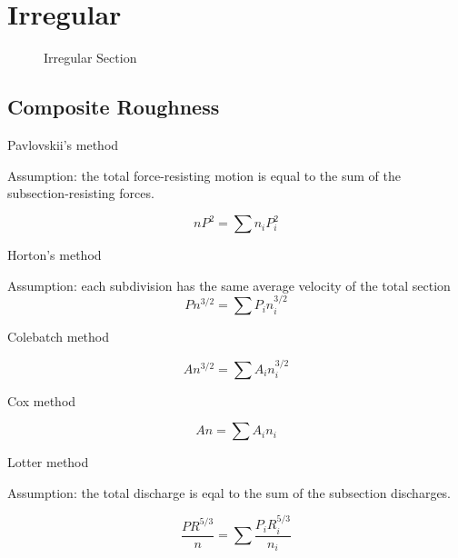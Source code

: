 
\section{Irregular}
\begin{figure}[h]
\centering
{}
\caption{Irregular Section}
\end{figure}

\subsection{Composite Roughness}

\noindent Pavlovskii's method

\noindent Assumption: the total force-resisting motion is equal to the sum of the subsection-resisting forces.

\begin{equation}
nP^2 = \sum n_iP_i^2
\end{equation}

\noindent Horton's method

\noindent Assumption: each subdivision has the same average velocity of the total section
\begin{equation}
Pn^{3/2} = \sum P_i  n_i^{3/2}
\end{equation}

\noindent Colebatch method

\begin{equation}
An^{3/2} = \sum A_i  n_i^{3/2}
\end{equation}

\noindent Cox method

\begin{equation}
An = \sum A_i  n_i
\end{equation}

\noindent Lotter method

\noindent Assumption: the total discharge is eqal to the sum of the subsection discharges.

\begin{equation}
\frac{PR^{5/3}}{n} = \sum \frac{P_i  R_i^{5/3}}{n_i}
\end{equation}
